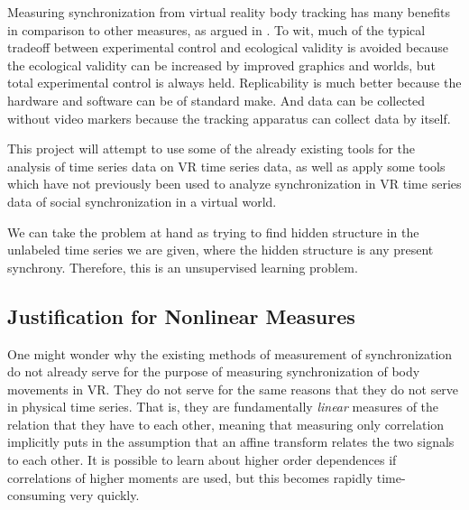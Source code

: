 \documentclass[12pt]{article}
\begin{document}
Measuring synchronization from virtual reality body tracking has many benefits in comparison to other measures, as argued in \cite{blascovich}. To wit, much of the typical tradeoff between experimental control and ecological validity is avoided because the ecological validity can be increased by improved graphics and worlds, but total experimental control is always held. Replicability is much better because the hardware and software can be of standard make. And data can be collected without video markers because the tracking apparatus can collect data by itself. \cite{blascovich}

This project will attempt to use some of the already existing tools for the analysis of time series data on VR time series data, as well as apply some tools which have not previously been used to analyze synchronization in VR time series data of social synchronization in a virtual world.

We can take the problem at hand as trying to find hidden structure in the unlabeled time series we are given, where the hidden structure is any present synchrony. Therefore, this is an unsupervised learning problem\cite{socialsync}.

\subsection{Justification for Nonlinear Measures}

One might wonder why the existing methods of measurement of synchronization do not already serve for the purpose of measuring synchronization of body movements in VR. They do not serve for the same reasons that they do not serve in physical time series. That is, they are fundamentally \emph{linear} measures of the relation that they have to each other, meaning that measuring only correlation implicitly puts in the assumption that an affine transform relates the two signals to each other. It is possible to learn about higher order dependences if correlations of higher moments are used, but this becomes rapidly time-consuming very quickly\cite{pompe}.
\end{document}
